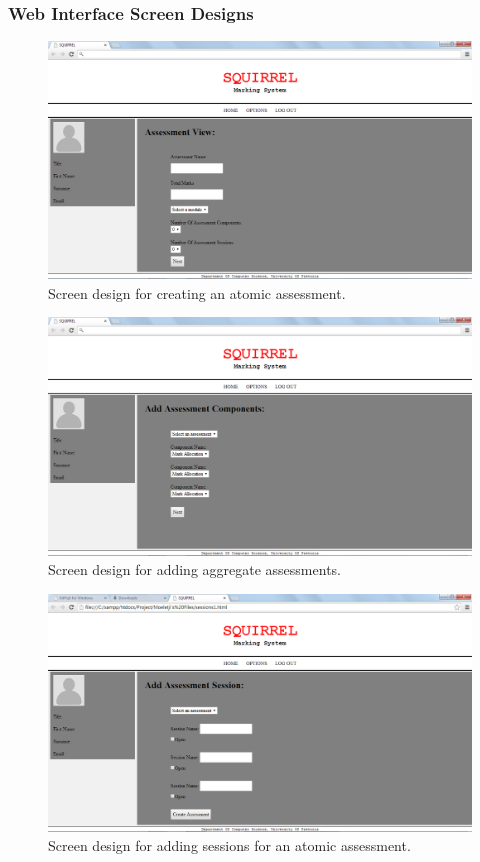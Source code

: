 \documentclass[11pt,a4paper]{article}
\begin{document}
\pagebreak	
\subsubsection{Web Interface Screen Designs}
\begin{figure}[h!]
\centering
\includegraphics[width=1.0\linewidth]{./web_assessmentView}
\caption{Screen design for creating an atomic assessment.}
\label{fig:web_assessmentView}
\end{figure}


		\begin{figure}[h!]
		\centering
		\includegraphics[width=1.0\linewidth]{./web_assessmentComponent}
		\caption{Screen design for adding aggregate assessments.}
		\label{fig:web_assessmentComponent}
		\end{figure}

\pagebreak
\begin{figure}[h!]
\centering
\includegraphics[width=1.0\linewidth]{./web_assessmentSession}
\caption{Screen design for adding sessions for an atomic assessment.}
\label{fig:web_assessmentSession}
\end{figure}
\end{document}
